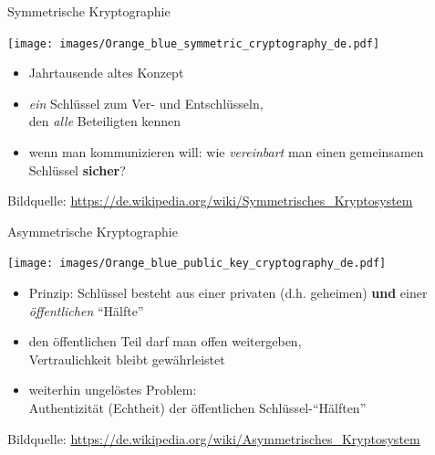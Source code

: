   \begin{frame}{Symmetrische Kryptographie}
    \begin{center}
      \texttt{[image: images/Orange\_blue\_symmetric\_cryptography\_de.pdf]}
    \end{center}
    \begin{itemize}
      \item Jahrtausende altes Konzept
      \item \textit{ein} Schlüssel zum Ver- und Entschlüsseln,\\den \textit{alle} Beteiligten kennen
      \item wenn man kommunizieren will: wie \textit{vereinbart} man einen gemeinsamen Schlüssel \textbf{sicher}?
    \end{itemize}
    \tiny Bildquelle: \url{https://de.wikipedia.org/wiki/Symmetrisches_Kryptosystem}
  \end{frame}
  
  \begin{frame}{Asymmetrische Kryptographie}
    \begin{center}
      \texttt{[image: images/Orange\_blue\_public\_key\_cryptography\_de.pdf]}
    \end{center}
    \begin{itemize}
      \item Prinzip: Schlüssel besteht aus einer privaten (d.h. geheimen) \textbf{und} einer \textit{öffentlichen} ``Hälfte''
      \item den öffentlichen Teil darf man offen weitergeben,\\Vertraulichkeit bleibt gewährleistet
      \item weiterhin ungelöstes Problem:\\Authentizität (Echtheit) der öffentlichen Schlüssel-``Hälften''
    \end{itemize}
    \tiny Bildquelle: \url{https://de.wikipedia.org/wiki/Asymmetrisches_Kryptosystem}
  \end{frame}

